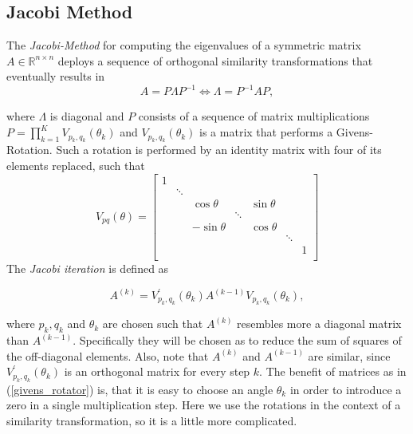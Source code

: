 \documentclass[12pt]{article}
\begin{document}
\subsection{Jacobi Method}

The \textit{Jacobi-Method} for computing the eigenvalues of a symmetric matrix $A \in \mathbb{R}^{n \times n}$ deploys a sequence of orthogonal similarity transformations that eventually results in
$$ A = P \Lambda P^{-1} \Leftrightarrow \Lambda = P^{-1} A P,$$

where $\Lambda$ is diagonal and $P$ consists of a sequence of matrix multiplications $P = \prod\limits_{k=1}^{K} V_{p_k, q_k}(\theta_k)$ and $V_{p_k, q_k}(\theta_k)$ is a matrix that performs a Givens-Rotation. Such a rotation is performed by an identity matrix with four of its elements replaced, such that
\small
\begin{equation}
\label{givens_rotator}
V_{pq}(\theta) = \begin{bmatrix}
                      1 \\
                        & \ddots \\
                        &        & \cos\theta    &        & \sin\theta  \\
                        &        &               & \ddots     \\
                        &        & -\sin\theta   &        & \cos\theta   \\
                        &        &               &        &            &  \ddots \\
                        &        &               &        &            &         & 1 \\
                 \end{bmatrix}
\end{equation}
\normalsize
\newpage
The \textit{Jacobi iteration} is defined as

\begin{equation}
A^{(k)} = V^{\prime}_{p_k, q_k}(\theta_k) A^{(k-1)} V_{p_k, q_k}(\theta_k),
\end{equation}

where $p_k, q_k$ and $\theta_k$ are chosen such that $A^{(k)}$ resembles more a diagonal matrix than $A^{(k-1)}$. Specifically they will be chosen as to reduce the sum of squares of the off-diagonal elements. Also, note that $A^{(k)}$ and $A^{(k-1)}$ are similar, since $V^{\prime}_{p_k, q_k}(\theta_k)$ is an orthogonal matrix for every step $k$. The benefit of matrices as in (\ref{givens_rotator}) is, that it is easy to choose an angle $\theta_k$ in order to introduce a zero in a single multiplication step. Here we use the rotations in the context of a similarity transformation, so it is a little more complicated.
\end{document}

